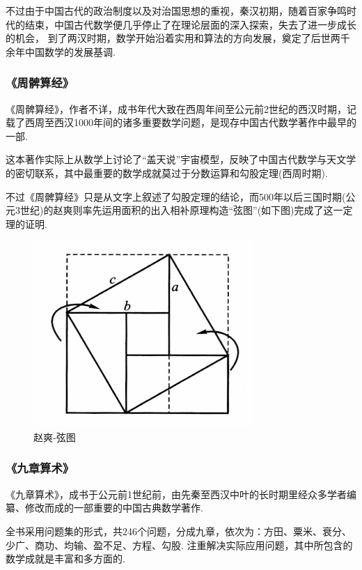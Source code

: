\documentclass{Math_Note}
\begin{document}
不过由于中国古代的政治制度以及对治国思想的重视，秦汉初期，随着百家争鸣时代的结束，中国古代数学便几乎停止了在理论层面的深入探索，失去了进一步成长的机会，
到了两汉时期，数学开始沿着实用和算法的方向发展，奠定了后世两千余年中国数学的发展基调.

\subsubsection{《周髀算经》}
《周髀算经》，作者不详，成书年代大致在西周年间至公元前2世纪的西汉时期，记载了西周至西汉1000年间的诸多重要数学问题，是现存中国古代数学著作中最早的一部.

这本著作实际上从数学上讨论了“盖天说”宇宙模型，反映了中国古代数学与天文学的密切联系，其中最重要的数学成就莫过于分数运算和勾股定理(西周时期).

不过《周髀算经》只是从文字上叙述了勾股定理的结论，而500年以后三国时期(公元3世纪)的赵爽则率先运用面积的出入相补原理构造“弦图”(如下图)完成了这一定理的证明.

\begin{figure}[H]
    \centering
    \includegraphics[scale=0.8]{"./Figures/string_graphic.png"}
    \caption{赵爽-弦图}
\end{figure}

\subsubsection{《九章算术》}
《九章算术》，成书于公元前1世纪前，由先秦至西汉中叶的长时期里经众多学者编纂、修改而成的一部重要的中国古典数学著作.

全书采用问题集的形式，共246个问题，分成九章，依次为：方田、粟米、衰分、少广、商功、均输、盈不足、方程、勾股. 
注重解决实际应用问题，其中所包含的数学成就是丰富和多方面的.
\end{document}
